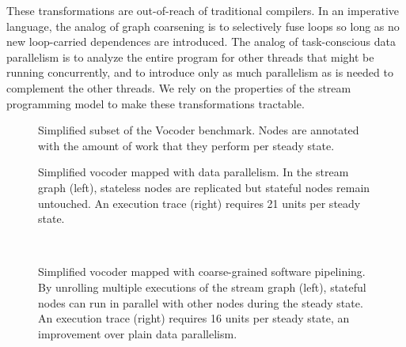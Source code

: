 These transformations are out-of-reach of traditional compilers.  In
an imperative language, the analog of graph coarsening is to
selectively fuse loops so long as no new loop-carried dependences are
introduced.  The analog of task-conscious data parallelism is to
analyze the entire program for other threads that might be running
concurrently, and to introduce only as much parallelism as is needed
to complement the other threads.  We rely on the properties of the
stream programming model to make these transformations tractable.

\begin{figure}[t]
\centering
{}
\caption[Simplified subset of the Vocoder benchmark]{Simplified subset
  of the Vocoder benchmark.  Nodes are annotated with the amount of
  work that they perform per steady state.\protect\label{fig:vocoder}}
\end{figure}

\begin{figure}[t!]
\centering
{}
\caption[Coarse-grained data parallelism applied to
  Vocoder]{Simplified vocoder mapped with data parallelism.  In the
  stream graph (left), stateless nodes are replicated but stateful
  nodes remain untouched.  An execution trace (right) requires 21
  units per steady state.\protect\label{fig:vocoder-data}}

~ \\ \vspace{6pt}
\caption[Coarse-grained software pipelining applied to
  Vocoder]{Simplified vocoder mapped with coarse-grained software
  pipelining.  By unrolling multiple executions of the stream graph
  (left), stateful nodes can run in parallel with other nodes during
  the steady state.  An execution trace (right) requires 16 units per
  steady state, an improvement over plain data parallelism.
  \protect\label{fig:vocoder-swpipe}}
\end{figure}


